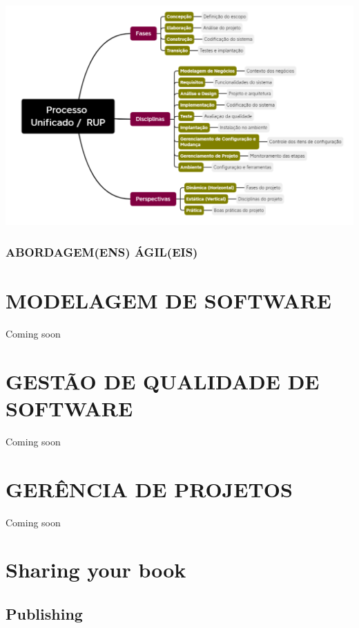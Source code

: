 \documentclass[
]{book}
\begin{document}
\includegraphics{images/modelos_processos_software/rup.png}

\subsection{ABORDAGEM(ENS) ÁGIL(EIS)}\label{abordagemens-uxe1gileis}

\chapter{MODELAGEM DE SOFTWARE}\label{modelagem-de-software}

Coming soon

\chapter{GESTÃO DE QUALIDADE DE SOFTWARE}\label{gestuxe3o-de-qualidade-de-software}

Coming soon

\chapter{GERÊNCIA DE PROJETOS}\label{geruxeancia-de-projetos}

Coming soon

\chapter{Sharing your book}\label{sharing-your-book}

\section{Publishing}\label{publishing}
\end{document}
